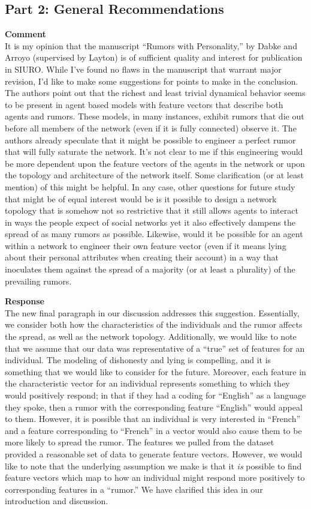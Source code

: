\subsection{Part 2: General Recommendations}
\textbf{Comment} \\
It is my opinion that the manuscript ``Rumors with Personality,'' by Dabke and Arroyo (supervised by Layton) is of sufficient quality and interest for publication in SIURO.
While I've found no flaws in the manuscript that warrant major revision, I'd like to make some suggestions for points to make in the conclusion.
The authors point out that the richest and least trivial dynamical behavior seems to be present in agent based models with feature vectors that describe both agents and rumors.
These models, in many instances, exhibit rumors that die out before all members of the network (even if it is fully connected) observe it.
The authors already speculate that it might be possible to engineer a perfect rumor that will fully saturate the network.
It's not clear to me if this engineering would be more dependent upon the feature vectors of the agents in the network or upon the topology and architecture of the network itself.
Some clarification (or at least mention) of this might be helpful.
In any case, other questions for future study that might be of equal interest would be is it possible to design a network topology that is somehow not so restrictive that it still allows agents to interact in ways the people expect of social networks yet it also effectively dampens the spread of as many rumors as possible.
Likewise, would it be possible for an agent within a network to engineer their own feature vector (even if it means lying about their personal attributes when creating their account) in a way that inoculates them against the spread of a majority (or at least a plurality) of the prevailing rumors.

\textbf{Response} \\
The new final paragraph in our discussion addresses this suggestion.
Essentially, we consider both how the characteristics of the individuals and the rumor affects the spread, as well as the network topology.
Additionally, we would like to note that we assume that our data was representative of a ``true'' set of features for an individual.
The modeling of dishonesty and lying is compelling, and it is something that we would like to consider for the future.
Moreover, each feature in the characteristic vector for an individual represents something to which they would positively respond; in that if they had a coding for ``English'' as a language they spoke, then a rumor with the corresponding feature ``English'' would appeal to them.
However, it is possible that an individual is very interested in ``French'' and a feature corresponding to ``French'' in a vector would also cause them to be more likely to spread the rumor.
The features we pulled from the dataset provided a reasonable set of data to generate feature vectors.
However, we would like to note that the underlying assumption we make is that it \textit{is} possible to find feature vectors which map to how an individual might respond more positively to corresponding features in a ``rumor.''
We have clarified this idea in our introduction and discussion.
